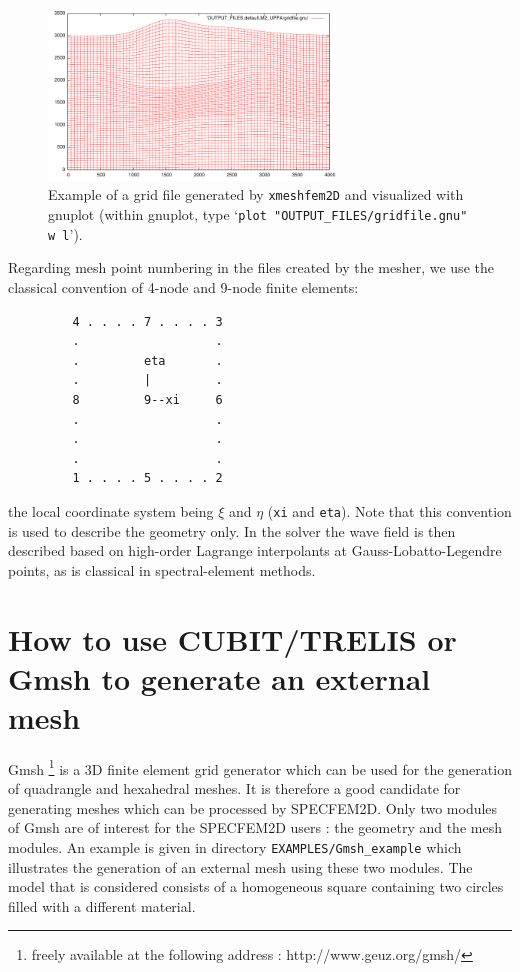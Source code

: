 \documentclass[oneside,english,onecolumn,letterpaper]{book}
\begin{document}
\begin{figure}[htbp]
\centering
\includegraphics[width=3in]{figures/example-gridfile.pdf}
\caption{Example of a grid file generated by \texttt{xmeshfem2D} and visualized with gnuplot
(within gnuplot, type `\texttt{plot "OUTPUT\_FILES/gridfile.gnu" w l}').}
\label{fig:example.mesh}
\end{figure}

Regarding mesh point numbering in the files created by the mesher, we use the classical convention of 4-node and 9-node finite elements:
%
\begin{verbatim}
         4 . . . . 7 . . . . 3
         .                   .
         .         eta       .
         .         |         .
         8         9--xi     6
         .                   .
         .                   .
         .                   .
         1 . . . . 5 . . . . 2
\end{verbatim}
%
the local coordinate system being $\xi$ and $\eta$ (\texttt{xi} and \texttt{eta}).
Note that this convention is used to describe the geometry only. In the solver the wave field is then described based on high-order Lagrange interpolants
at Gauss-Lobatto-Legendre points, as is classical in spectral-element methods.

\section{How to use CUBIT/TRELIS or Gmsh to generate an external mesh}

Gmsh%
\footnote{freely available at the following address : http://www.geuz.org/gmsh/%
} is a 3D finite element grid generator which can be used for the generation
of quadrangle and hexahedral meshes. It is therefore a good candidate
for generating meshes which can be processed by SPECFEM2D. Only two
modules of Gmsh are of interest for the SPECFEM2D users : the geometry
and the mesh modules. An example is given in directory \texttt{EXAMPLES/Gmsh\_example}
which illustrates the generation of an external mesh using these two
modules. The model that is considered consists of a homogeneous
square containing two circles filled with a different material.
\end{document}

